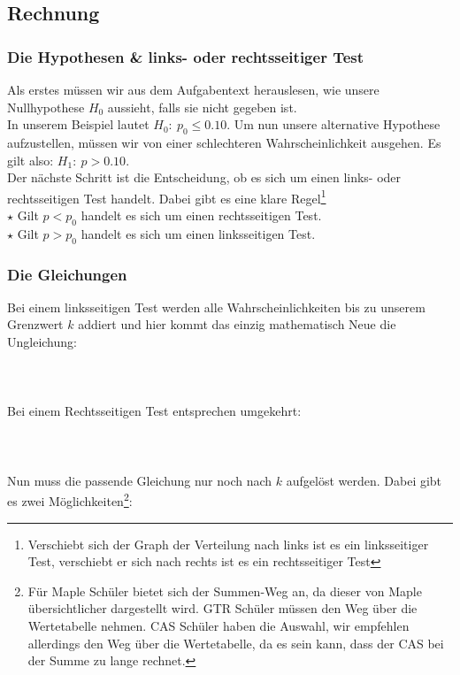 \subsection{Rechnung}
	\subsubsection{Die Hypothesen \& links- oder rechtsseitiger Test}
		Als erstes müssen wir aus dem Aufgabentext herauslesen, wie unsere
		Nullhypothese \(H_0\) aussieht, falls sie nicht gegeben ist.\\
		In unserem Beispiel lautet \(H_0:\ p_0\leq 0.10\). Um nun unsere alternative
		Hypothese aufzustellen, müssen wir von einer schlechteren Wahrscheinlichkeit
		ausgehen. Es gilt also: \(H_1:\ p>0.10\).\\
		Der nächste Schritt ist die Entscheidung, ob es sich um einen links- oder
		rechtsseitigen Test handelt. Dabei gibt es eine klare
		Regel\footnote{Verschiebt sich der Graph der Verteilung nach links ist es ein
		linksseitiger Test, verschiebt er sich nach rechts ist es ein rechtsseitiger
		Test}\\
		\(\star\) Gilt \(p<p_0\) handelt es sich um einen rechtsseitigen Test.\\
		\(\star\) Gilt \(p>p_0\) handelt es sich um einen linksseitigen Test.\\
	
	\subsubsection{Die Gleichungen}
		Bei einem linksseitigen Test werden alle Wahrscheinlichkeiten bis zu unserem
		Grenzwert \(k\) addiert und hier kommt das einzig mathematisch Neue die
		Ungleichung:
		\\ \\
		\formel{\[P(X\geq k)=B(n,p_0,0)+B(n,p_0,1)+\ldots+B(n,p_0,k) \leq \alpha\]}
		\\ \\
		Bei einem Rechtsseitigen Test entsprechen umgekehrt:
		\\ \\
		\formel{\[P(X\leq k)=B(n,p_0,k)+B(n,p_0,k+1)+\ldots+B(n,p_0,n) \leq \alpha\]}
		\\ \\
		Nun muss die passende Gleichung nur noch nach \(k\) aufgelöst werden. Dabei
		gibt es zwei Möglichkeiten\footnote{Für Maple Schüler bietet sich der Summen-Weg
		an, da dieser von Maple übersichtlicher dargestellt wird. GTR Schüler müssen
		den Weg über die Wertetabelle nehmen. CAS Schüler haben die Auswahl, wir
		empfehlen allerdings den Weg über die Wertetabelle, da es sein kann, dass der
		CAS bei der Summe zu lange rechnet.}:\\


